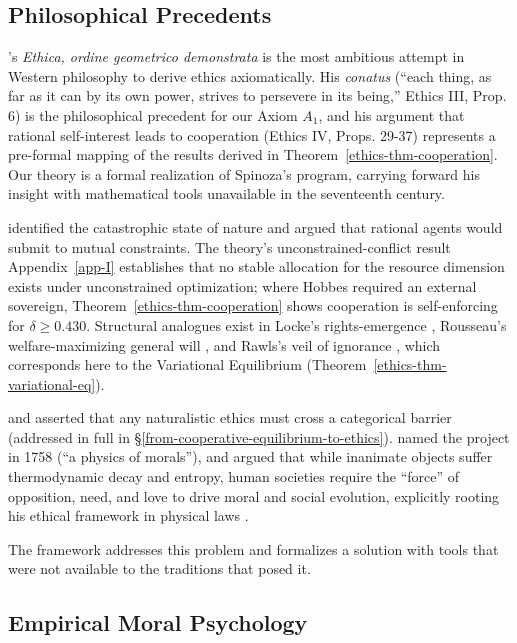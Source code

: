 \documentclass[11pt]{article}
\theoremstyle{plain}
\theoremstyle{definition}
\theoremstyle{remark}
\let\origsubsection\subsection
\renewcommand{\subsection}{\needspace{7\baselineskip}\origsubsection}
\begin{document}
\subsection{Philosophical Precedents}\label{philosophical-precedents}

\citet{Spinoza1677}'s \emph{Ethica, ordine geometrico demonstrata} is
the most ambitious attempt in Western philosophy to derive ethics
axiomatically. His \emph{conatus} (``each thing, as far as it can by its
own power, strives to persevere in its being,'' Ethics III, Prop. 6) is
the philosophical precedent for our Axiom \(A_1\), and his argument that
rational self-interest leads to cooperation (Ethics IV, Props. 29-37)
represents a pre-formal mapping of the results derived in
Theorem~\ref{ethics-thm-cooperation}. Our theory is a formal realization
of Spinoza's program, carrying forward his insight with mathematical
tools unavailable in the seventeenth century.

\citet{Hobbes1651} identified the catastrophic state of nature and
argued that rational agents would submit to mutual constraints. The
theory's unconstrained-conflict result Appendix~\ref{app-I} establishes
that no stable allocation for the resource dimension exists under
unconstrained optimization; where Hobbes required an external sovereign,
Theorem~\ref{ethics-thm-cooperation} shows cooperation is self-enforcing
for \(\delta \geq 0.430\). Structural analogues exist in Locke's
rights-emergence \citep{Locke1689}, Rousseau's welfare-maximizing
general will \citep{Rousseau1762}, and Rawls's veil of ignorance
\citep{Rawls1971}, which corresponds here to the Variational Equilibrium
(Theorem~\ref{ethics-thm-variational-eq}).

\citet{Hume1739} and \citet{Moore1903} asserted that any naturalistic
ethics must cross a categorical barrier (addressed in full in
§\ref{from-cooperative-equilibrium-to-ethics}). \citet{Helvetius1758}
named the project in 1758 (``a physics of morals''), and
\citet{Bazargan1956} argued that while inanimate objects suffer
thermodynamic decay and entropy, human societies require the ``force''
of opposition, need, and love to drive moral and social evolution,
explicitly rooting his ethical framework in physical laws
\citep{Kurzman1998}.

The framework addresses this problem and formalizes a solution with
tools that were not available to the traditions that posed it.

\subsection{Empirical Moral
Psychology}\label{empirical-moral-psychology}
\end{document}
